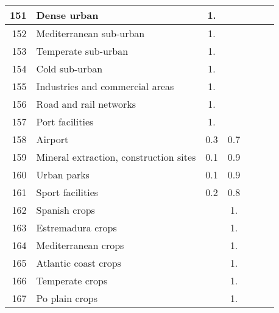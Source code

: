{{\begin{tabular}{||r|l||c|c|c|c|c||}
 \hline
 \hline
         151  & Dense urban                                                  &  1.   &       &       &       \\
 \hline
         152  & Mediterranean sub-urban                                      &  1.   &       &       &       \\
 \hline
         153  & Temperate sub-urban                                          &  1.   &       &       &       \\
 \hline
         154  & Cold sub-urban                                               &  1.   &       &       &       \\
 \hline
         155  & Industries and commercial areas                              &  1.   &       &       &       \\
 \hline
         156  & Road and rail networks                                       &  1.   &       &       &       \\
 \hline
         157  & Port facilities                                              &  1.   &       &       &       \\
 \hline
         158  & Airport                                                      &  0.3  &  0.7  &       &       \\
 \hline
         159  & Mineral extraction, construction sites                       &  0.1  &  0.9  &       &       \\
 \hline
         160  & Urban parks                                                  &  0.1  &  0.9  &       &       \\
 \hline
         161  & Sport facilities                                             &  0.2  &  0.8  &       &       \\
 \hline
 \hline
         162  & Spanish crops                                                &       &  1.   &       &       \\
 \hline
         163  & Estremadura crops                                            &       &  1.   &       &       \\
 \hline
         164  & Mediterranean crops                                          &       &  1.   &       &       \\
 \hline
         165  & Atlantic coast crops                                         &       &  1.   &       &       \\
 \hline
         166  & Temperate crops                                              &       &  1.   &       &       \\
 \hline
         167  & Po plain crops                                               &       &  1.   &       &       \\

\end{tabular}}}
